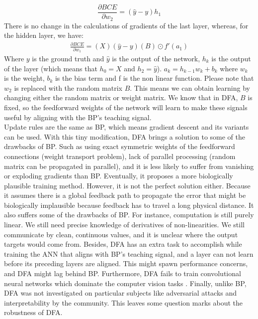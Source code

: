 \documentclass[a4paper, nobind]{templates/ociamthesis}
\begin{document}
\[
\frac{\partial BCE}{\partial w_{2}}=\left(\hat{y}-y\right)h_{1}
\]
There is no change in the calculations of gradients of the last layer, whereas, for the hidden layer, we have:
\[
\begin{aligned}
\frac{\partial BCE}{\partial w_{1}}= \left(X\right)\left(\hat{y}-y\right)\left(B\right) \odot f'(a_1)
\end{aligned}
\]
Where \(y\) is the ground truth and \(\hat{y}\) is the output of the network, \(h_k\) is the output of the layer (which means that \(h_0 = X\) and \(h_2 = \hat{y}\)). \(a_{k} = h_{k-1} w_{k} + b_k\) where \(w_k\) is the weight, \(b_{k}\) is the bias term and f is the non linear function.
Please note that \(w_2\) is replaced with the random matrix \(B\). This means we can obtain learning by changing either the random matrix or weight matrix. We know that in DFA, \(B\) is fixed, so the feedforward weights of the network will learn to make these signals useful by aligning with the BP's teaching signal.\\
Update rules are the same as BP, which means gradient descent and its variants can be used. With this tiny modification, DFA brings a solution to some of the drawbacks of BP. Such as using exact symmetric weights of the feedforward connections (weight transport problem), lack of parallel processing (random matrix can be propagated in parallel), and it is less likely to suffer from vanishing or exploding gradients than BP. Eventually, it proposes a more biologically plausible training method. However, it is not the perfect solution either. Because it assumes there is a global feedback path to propagate the error that might be biologically implausible because feedback has to travel a long physical distance. It also suffers some of the drawbacks of BP. For instance, computation is still purely linear. We still need precise knowledge of derivatives of non-linearities. We still communicate by clean, continuous values, and it is unclear where the output targets would come from. Besides, DFA has an extra task to accomplish while training the ANN that aligns with BP's teaching signal, and a layer can not learn before its preceding layers are aligned. This might spawn performance concerns, and DFA might lag behind BP.
Furthermore, DFA fails to train convolutional neural networks which dominate the computer vision tasks \cite{refinetti2021align, launay2019principled}. Finally, unlike BP, DFA was not investigated on particular subjects like adversarial attacks and interpretability by the community. This leaves some question marks about the robustness of DFA.
\end{document}
